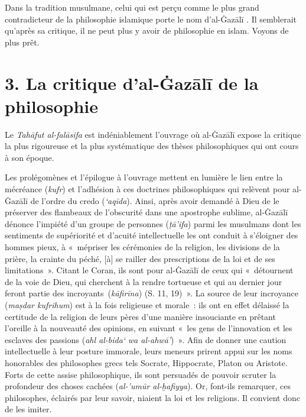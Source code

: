 Dans la tradition musulmane, celui qui est perçu comme le plus grand
contradicteur de la philosophie islamique porte le nom d'al-Ġazālī  \label{theol:AlGazali2}. Il
semblerait qu'après sa critique, il ne peut plus y avoir de philosophie
en islam. Voyons de plus prêt.

\hypertarget{la-critique-dal-ux121azux101lux12b-de-la-philosophie}{%
\section{3. La critique d'al-Ġazālī de la
philosophie}\label{la-critique-dal-ux121azux101lux12b-de-la-philosophie}}

Le \emph{Tahāfut al-falāsifa} est indéniablement l'ouvrage où al-Ġazālī \label{theol:AlGazali3}
expose la critique la plus rigoureuse et la plus systématique des thèses
philosophiques qui ont cours à son époque.

Les prolégomènes et l'épilogue à l'ouvrage mettent en lumière le lien
entre la mécréance (\emph{kufr}) et l'adhésion à ces doctrines
philosophiques qui relèvent pour al-Ġazālī de l'ordre du credo
(\emph{`aqīda}). Ainsi, après avoir demandé à Dieu de le préserver des
flambeaux de l'obscurité dans une apostrophe sublime, al-Ġazālī dénonce
l'impiété d'un groupe de personnes (\emph{ṭā'ifa}) parmi les musulmans
dont les sentiments de supériorité et d'acuité intellectuelle les ont
conduit à s'éloigner des hommes pieux, à «~mépriser les cérémonies de la
religion, les divisions de la prière, la crainte du péché, {[}à{]} se
railler des prescriptions de la loi et de ses limitations~». Citant le Coran, ils sont pour
al-Ġazālī de ceux qui «~détournent de la voie de Dieu, qui cherchent à
la rendre tortueuse et qui au dernier jour feront partie des
incroyants~(\emph{kāfirīna}) (S. 11, 19)~». La source de leur incroyance (\emph{maṣdar kufrihum}) est à la
fois religieuse et morale~: ils ont en effet délaissé la certitude de la
religion de leurs pères d'une manière insouciante en prêtant l'oreille à
la nouveauté des opinions, en suivant «~les gens de l'innovation et les
esclaves des passions (\emph{ahl al-bida`} \emph{wa
al-ahwā'})~». Afin de
donner une caution intellectuelle à leur posture immorale, leurs meneurs
prirent appui sur les noms honorables des philosophes grecs tels
Socrate, Hippocrate, Platon ou Aristote. Forts de cette assise
philosophique, ils sont persuadés de pouvoir scruter la profondeur des
choses cachées (\emph{al-'umūr al-ḫafiyya}). Or, font-ils remarquer, ces
philosophes, éclairés par leur savoir, niaient la loi et les religions.
Il convient donc de les imiter.


